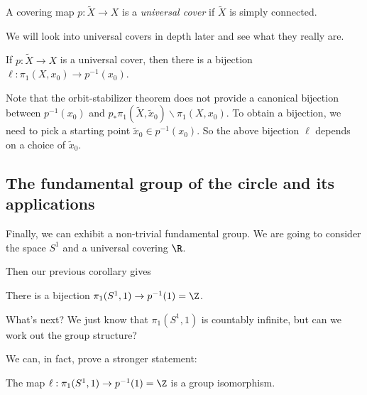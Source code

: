 \documentclass[a4paper]{article}
\begin{document}
\begin{defi}
  A covering map $p: \tilde{X} \to X$ is a \emph{universal cover} if $\tilde{X}$ is simply connected.
\end{defi}
We will look into universal covers in depth later and see what they really are.

\begin{cor}
  If $p: \tilde{X} \to X$ is a universal cover, then there is a bijection $\ell: \pi_1(X, x_0) \to p^{-1}(x_0)$.
\end{cor}
Note that the orbit-stabilizer theorem does not provide a canonical bijection between $p^{-1}(x_0)$ and $p_* \pi_1(\tilde{X}, \tilde{x}_0)\backslash \pi_1(X,x_0)$. To obtain a bijection, we need to pick a starting point $\tilde{x}_0 \in p^{-1}(x_0)$. So the above bijection $\ell$ depends on a choice of $\tilde{x}_0$.

\subsection{The fundamental group of the circle and its applications}
Finally, we can exhibit a non-trivial fundamental group. We are going to consider the space $S^1$ and a universal covering $\R$.
\begin{center}
\end{center}
Then our previous corollary gives
\begin{cor}
  There is a bijection $\pi_1(S^1, 1) \to p^{-1}(1) = \Z$.
\end{cor}
What's next? We just know that $\pi_1(S^1, 1)$ is countably infinite, but can we work out the group structure?

We can, in fact, prove a stronger statement:
\begin{thm}
  The map $\ell: \pi_1(S^1, 1) \to p^{-1}(1) = \Z$ is a group isomorphism.
\end{thm}
\end{document}
